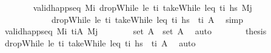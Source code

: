 \begin{isabellebody}
\ \ \ \ \ \ \isamarkupfalse%
\ {\isacartoucheopen}valid{\isacharunderscore}{\kern0pt}happ{\isacharunderscore}{\kern0pt}seq\ M\isactrlsub i\ {\isacharparenleft}{\kern0pt}dropWhile\ {\isacharparenleft}{\kern0pt}le\ t\isactrlsub i{\isacharparenright}{\kern0pt}\ {\isacharparenleft}{\kern0pt}takeWhile\ {\isacharparenleft}{\kern0pt}leq\ t\isactrlsub i{\isacharparenright}{\kern0pt}\ hs\ M\isactrlsub j{\isacartoucheclose}\ \isanewline
\ \ \ \ \ \ \ \ \ \ \ \ {\isacartoucheopen}dropWhile\ {\isacharparenleft}{\kern0pt}le\ t\isactrlsub i{\isacharparenright}{\kern0pt}\ {\isacharparenleft}{\kern0pt}takeWhile\ {\isacharparenleft}{\kern0pt}leq\ t\isactrlsub i{\isacharparenright}{\kern0pt}\ hs\ {\isacharequal}{\kern0pt}\ {\isacharbrackleft}{\kern0pt}{\isacharparenleft}{\kern0pt}t\isactrlsub i{\isacharcomma}{\kern0pt}\ A\ \isamarkupfalse%
\ simp\isanewline
\ \ \ \ \isamarkupfalse%
\ \isamarkupfalse%
\ {\isachardoublequoteopen}valid{\isacharunderscore}{\kern0pt}happ{\isacharunderscore}{\kern0pt}seq\ M\isactrlsub i\ {\isacharbrackleft}{\kern0pt}{\isacharparenleft}{\kern0pt}t\isactrlsub i{\isacharcomma}{\kern0pt}A\ M\isactrlsub j{\isachardoublequoteclose}\isanewline
\ \ \ \ \ \ \isamarkupfalse%
\ {\isacartoucheopen}set\ A\ {\isacharequal}{\kern0pt}\ set\ A\ \isamarkupfalse%
\ auto\isanewline
\ \ \ \ \isamarkupfalse%
\ \isamarkupfalse%
\ {\isacharquery}{\kern0pt}thesis\isanewline
\ \ \ \ \ \ \isamarkupfalse%
\ {\isacartoucheopen}dropWhile\ {\isacharparenleft}{\kern0pt}le\ t\isactrlsub i{\isacharparenright}{\kern0pt}\ {\isacharparenleft}{\kern0pt}takeWhile\ {\isacharparenleft}{\kern0pt}leq\ t\isactrlsub i{\isacharparenright}{\kern0pt}\ hs\ {\isacharequal}{\kern0pt}\ {\isacharbrackleft}{\kern0pt}{\isacharparenleft}{\kern0pt}t\isactrlsub i{\isacharcomma}{\kern0pt}\ A\ \isamarkupfalse%
\ auto\isanewline
\ \ \isamarkupfalse%

\end{isabellebody}
